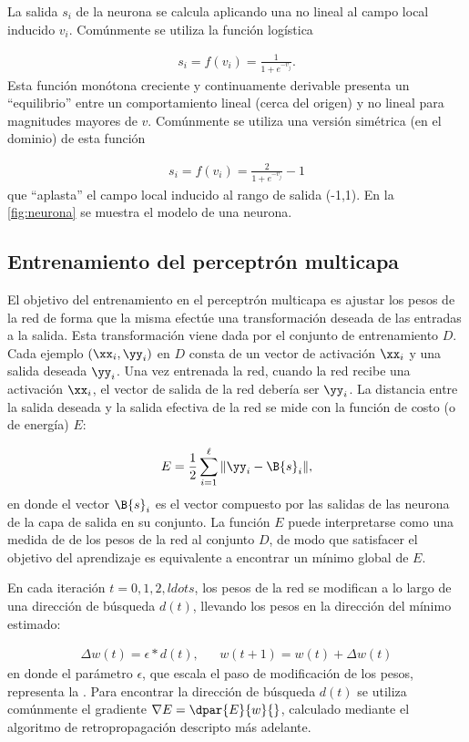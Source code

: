 La salida $s_i$ de la neurona se calcula aplicando
una  no lineal al campo local
inducido $v_i$. Comúnmente se utiliza la función logística

\begin{align*}
  s_i=f(v_i)=\frac{1}{1+e^{-v_j}}.
\end{align*}
Esta función monótona creciente y continuamente derivable presenta un
``equilibrio'' entre un comportamiento lineal (cerca del origen) y no
lineal para magnitudes mayores de $v$. Comúnmente se utiliza una
versión simétrica (en el dominio) de esta función

\begin{align*}
  s_i=f(v_i) = \frac{2}{1+e^{-v_j}}-1
\end{align*}
que ``aplasta'' el campo local inducido al rango de salida (-1,1).
En la \autoref{fig:neurona} se muestra el modelo de una neurona.

\subsection{Entrenamiento del perceptrón multicapa}
El objetivo del entrenamiento en el perceptrón multicapa es ajustar
los pesos de la red de forma que la misma efectúe una transformación
deseada de las entradas a la salida. Esta transformación viene dada
por el conjunto de entrenamiento $D$.
Cada ejemplo $(\xx_i,\yy_i)$ en $D$ consta de un vector de activación
$\xx_i$ y una salida deseada $\yy_i$. Una vez entrenada la red, cuando
la red recibe una activación $\xx_i$, el vector de salida de la red
debería ser $\yy_i$. La distancia entre la salida deseada y la salida
efectiva de la red se mide con la función de costo (o de energía) $E$:

\begin{align}
  E = \frac{1}{2}\sum_{i=1}^{\ell}\|\yy_i-\B{s}_i\|,
\end{align}
en donde el vector $\B{s}_i$ es el vector compuesto por las salidas de
las neurona de la capa de salida en su conjunto.  La función $E$ puede
interpretarse como una medida de  de los pesos de la red al
conjunto $D$, de modo que satisfacer el objetivo del aprendizaje es
equivalente a encontrar un mínimo global de $E$.

En cada iteración $t=0,1,2,ldots$, los pesos de la red
se modifican a lo largo de una dirección de búsqueda
$d(t)$, llevando los pesos en la dirección del mínimo estimado:

\begin{align*}
  \Delta w(t) = \epsilon * d(t), && w(t+1) = w(t)+\Delta w(t)
\end{align*}
en donde el parámetro $\epsilon$, que escala el paso de modificación
de los pesos, representa la . Para
encontrar la dirección de búsqueda $d(t)$ se utiliza comúnmente el
gradiente $\nabla E = \dpar{E}{w}{}$, calculado mediante el algoritmo de
retropropagación descripto más adelante.

